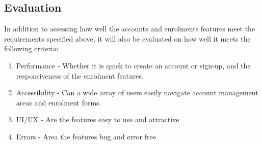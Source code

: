 \subsection{Evaluation}
In addition to assessing how well the accounts and enrolments features meet the requirements specified above, it will also be evaluated on how well it meets the following criteria:
\begin{enumerate}
    \item Performance - Whether it is quick to create an account or sign-up, and the responsiveness of the enrolment features.
    \item Accessibility - Can a wide array of users easily navigate account management areas and enrolment forms.
    \item UI/UX - Are the features easy to use and attractive
    \item Errors - Area the features bug and error free
\end{enumerate}